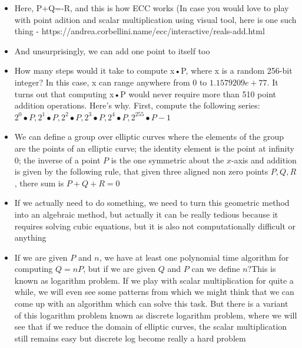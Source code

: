 \documentclass{article}
\begin{document}
\begin{itemize}
    \item Here, P+Q=-R, and this is how ECC works (In case you would love to play with point adition and scalar multiplication using visual tool, here is one such thing - https://andrea.corbellini.name/ecc/interactive/reals-add.html 
    \item  And unsurprisingly, we can add one point to itself too \item How many steps would it take to compute x•P, where x is a random 256-bit integer? In this case, x can range anywhere from 0 to $1.1579209e+77$.
    It turns out that computing x•P would never require more than 510 point addition operations. Here’s why. First, compute the following series:
    $2^0•P, 2^1•P, 2^2•P, 2^3•P, 2^4•P, 2^{255}•P-1$
    \item We can define a group over elliptic curves where the elements of the group are the points of an elliptic curve;
    the identity element is the point at infinity 0;
    the inverse of a point $P$ is the one symmetric about the $x$-axis and addition is given by the following rule, that given three aligned non zero points $P,Q,R$, there sum is $P+Q+R=0$
    \item If we actually need to do something, we need to turn this geometric method into an algebraic method, but actually it can be really tedious because it requires solving cubic equations, but it is also not computationally difficult or anything
    \item If we are given $P$ and $n$, we have at least one polynomial time algorithm for computing $Q=nP$, but if we are given $Q$ and $P$ can we define $n$?This is known as logarithm problem. If we play with scalar multiplication for quite a while, we will even see some patterns from which we might think that we can come up with an algorithm which can solve this task. But there is a variant of this logarithm problem known as discrete logarithm problem, where we will see that if we reduce the domain of elliptic curves, the scalar multiplication still remains easy but discrete log become really a hard problem
\end{itemize}
\end{document}
